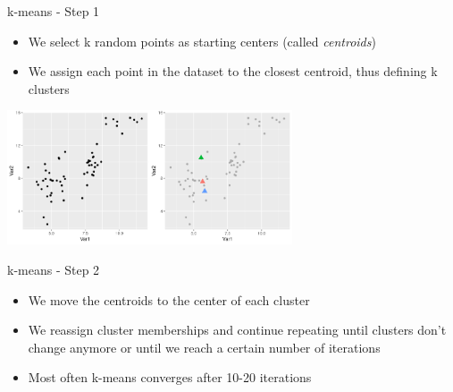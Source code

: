 \documentclass[9pt]{beamer}
\begin{document}
\begin{frame}
{k-means - Step 1}
\begin{itemize}
\item We select k random points as starting centers (called \textit{centroids})
\item We assign each point in the dataset to the closest centroid, thus defining k clusters
\end{itemize}

\begin{overprint}
\centering \includegraphics[height=150px]{kmeans-step1.png}
\end{overprint}
\end{frame}

\begin{frame}
{k-means - Step 2}
\begin{itemize}
\item We move the centroids to the center of each cluster
\item We reassign cluster memberships and continue repeating until clusters don't change anymore or until we reach a certain number of iterations
\item Most often k-means converges after 10-20 iterations
\end{itemize}
\end{frame}
\end{document}
